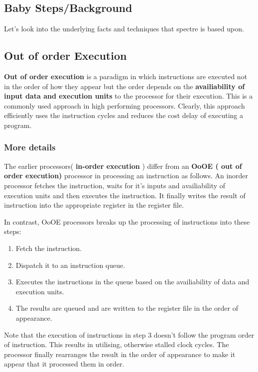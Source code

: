 \documentclass[12pt]{article}
\begin{document}
\newpage


\newpage
\begin{appendices}	
	\section{Baby Steps/Background}
	Let's look into the underlying facts and techniques that spectre is based upon.
	\subsection{Out of order Execution}
	
	\textbf{Out of order execution} is a paradigm in which instructions are executed not in the order of how they appear but the order depends on the \textbf{availiability of input data and execution units} to the processor for their execution. This is a commonly used approach in high performing processors. Clearly, this approach efficiently uses the instruction cycles and reduces the cost delay of executing a program.  
	
	\subsubsection{More details}
	The earlier processors( \textbf{in-order execution} ) differ from an \textbf{OoOE ( out of order execution)} processor in processing an instruction as follows. An inorder processor fetches the instruction, waits for it's inputs and availiability of execution units and then executes the instruction. It finally writes the result of instruction into the appropriate register in the register file. 
	
	In contrast, OoOE processors breaks up the processing of instructions into these steps:
	\begin{enumerate}
		\item Fetch the instruction.
		\item Dispatch it to an instruction queue.
		\item Executes the instructions in the queue based on the availiability of data and execution units.
		\item The results are queued and are written to the register file in the order of appearance.
	\end{enumerate}
	
	Note that the execution of instructions in step 3 doesn't follow the program order of instruction. 
	This results in utilising, otherwise stalled clock cycles. The processor finally rearranges the result in the order of appearance to make it appear that it processed them in order. 
	

\end{appendices}
\end{document}
